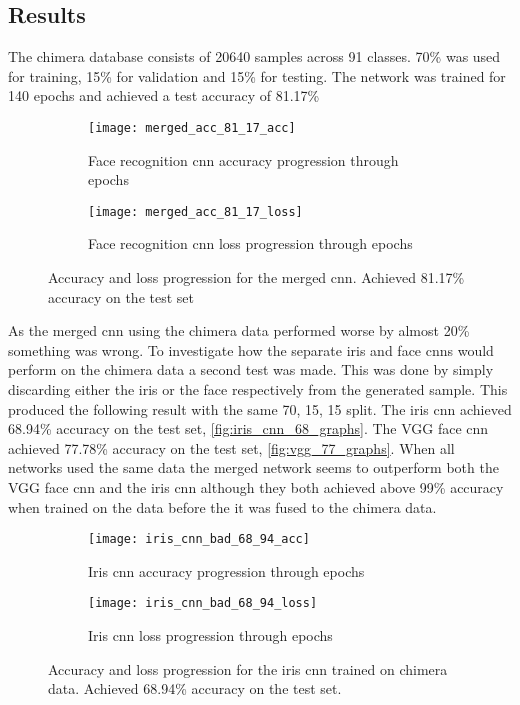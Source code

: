 \subsection{Results}
The chimera database consists of 20640 samples across 91 classes. 70\% was used for training, 15\% for validation and 15\% for testing. The network was trained for 140 epochs and achieved a test accuracy of 81.17\%

\begin{figure}[H]
	\centering
	\begin{subfigure}{0.48\textwidth}
		\centering
		\texttt{[image: merged\_acc\_81\_17\_acc]}
		\caption{Face recognition \gls{cnn} accuracy progression through epochs}
		\label{fig:merged_acc}
	\end{subfigure}
	\begin{subfigure}{0.48\textwidth}
		\centering
		\texttt{[image: merged\_acc\_81\_17\_loss]}
		\caption{Face recognition \gls{cnn} loss progression through epochs}
		\label{fig:merged_loss}
	\end{subfigure}
	\caption{Accuracy and loss progression for the merged \gls{cnn}. Achieved 81.17\% accuracy on the test set}
	\label{fig:merged_graphs}
\end{figure}

\noindent As the merged \gls{cnn} using the chimera data performed worse by almost 20\% something was wrong. To investigate how the separate iris and face \gls{cnn}s would perform on the chimera data a second test was made. This was done by simply discarding either the iris or the face respectively from the generated sample. This produced the following result with the same 70, 15, 15 split.  The iris \gls{cnn} achieved 68.94\% accuracy on the test set, \autoref{fig:iris_cnn_68_graphs}. The VGG face \gls{cnn} achieved 77.78\% accuracy on the test set, \autoref{fig:vgg_77_graphs}. When all networks used the same data the merged network seems to outperform both the VGG face \gls{cnn} and the iris \gls{cnn} although they both achieved above 99\% accuracy when trained on the data before the it was fused to the chimera data.

\begin{figure}[H]
	\centering
	\begin{subfigure}{0.48\textwidth}
		\centering
		\texttt{[image: iris\_cnn\_bad\_68\_94\_acc]}
		\caption{Iris \gls{cnn} accuracy progression through epochs}
		\label{fig:iris_cnn_68_acc}
	\end{subfigure}
	\begin{subfigure}{0.48\textwidth}
		\centering
		\texttt{[image: iris\_cnn\_bad\_68\_94\_loss]}
		\caption{Iris \gls{cnn} loss progression through epochs}
		\label{fig:iris_cnn_68_loss}
	\end{subfigure}
	\caption{Accuracy and loss progression for the iris \gls{cnn} trained on chimera data. Achieved 68.94\% accuracy on the test set.}
	\label{fig:iris_cnn_68_graphs}
\end{figure}


